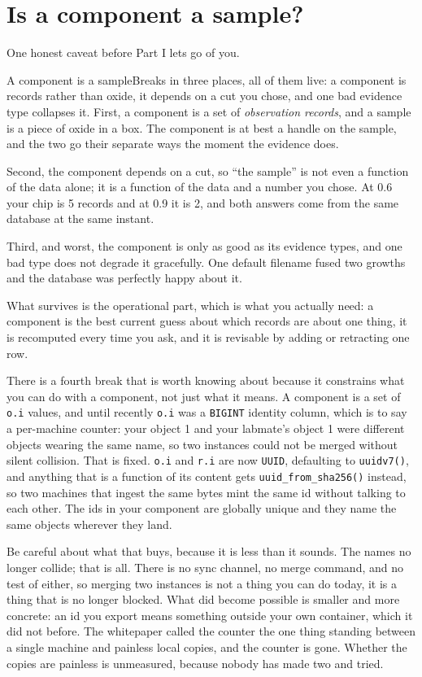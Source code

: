 \section{Is a component a sample?}

One honest caveat before Part I lets go of you.

\begin{Analogy}{A component is a sample}{Breaks in three places, all of them live: a component is records rather than oxide, it depends on a cut you chose, and one bad evidence type collapses it.}
First, a component is a set of \emph{observation records}, and a sample is a piece of oxide in a box. The component is at best a handle on the sample, and the two go their separate ways the moment the evidence does.

Second, the component depends on a cut, so ``the sample'' is not even a function of the data alone; it is a function of the data and a number you chose. At 0.6 your chip is 5 records and at 0.9 it is 2, and both answers come from the same database at the same instant.

Third, and worst, the component is only as good as its evidence types, and one bad type does not degrade it gracefully. One default filename fused two growths and the database was perfectly happy about it.

What survives is the operational part, which is what you actually need: a component is the best current guess about which records are about one thing, it is recomputed every time you ask, and it is revisable by adding or retracting one row.
\end{Analogy}

There is a fourth break that is worth knowing about because it constrains what you can do with a component, not just what it means. A component is a set of \texttt{o.i} values, and until recently \texttt{o.i} was a \texttt{BIGINT} identity column, which is to say a per-machine counter: your object 1 and your labmate's object 1 were different objects wearing the same name, so two instances could not be merged without silent collision. That is fixed. \texttt{o.i} and \texttt{r.i} are now \texttt{UUID}, defaulting to \texttt{uuidv7()}, and anything that is a function of its content gets \texttt{uuid\_from\_sha256()} instead, so two machines that ingest the same bytes mint the same id without talking to each other. The ids in your component are globally unique and they name the same objects wherever they land.

Be careful about what that buys, because it is less than it sounds. The names no longer collide; that is all. There is no sync channel, no merge command, and no test of either, so merging two instances is not a thing you can do today, it is a thing that is no longer blocked. What did become possible is smaller and more concrete: an id you export means something outside your own container, which it did not before. The whitepaper called the counter the one thing standing between a single machine and painless local copies, and the counter is gone. Whether the copies are painless is unmeasured, because nobody has made two and tried.

